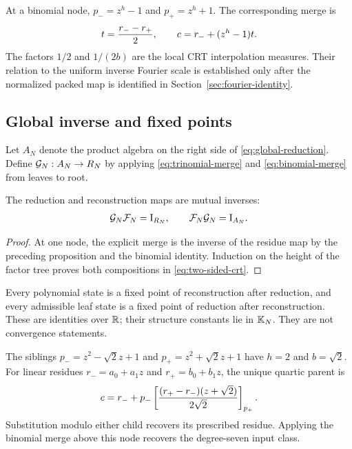 At a binomial node, $p_-=z^h-1$ and $p_+=z^h+1$.  The corresponding merge is
\begin{equation}
 t={r_--r_+\over2},
 \qquad c=r_-+(z^h-1)t.
 \label{eq:binomial-merge}
\end{equation}
The factors $1/2$ and $1/(2b)$ are the local CRT interpolation measures.  Their
relation to the uniform inverse Fourier scale is established only after the
normalized packed map is identified in Section~\ref{sec:fourier-identity}.

\subsection{Global inverse and fixed points}

Let $A_N$ denote the product algebra on the right side of
\eqref{eq:global-reduction}.  Define $\mathcal{G}_N:A_N\to R_N$ by applying
\eqref{eq:trinomial-merge} and \eqref{eq:binomial-merge} from leaves to root.

\begin{theorem}
The reduction and reconstruction maps are mutual inverses:
\begin{equation}
 \mathcal{G}_N\mathcal{F}_N=\mathrm{I}_{R_N},
 \qquad
 \mathcal{F}_N\mathcal{G}_N=\mathrm{I}_{A_N}.
 \label{eq:two-sided-crt}
\end{equation}
\end{theorem}
\begin{proof}
At one node, the explicit merge is the inverse of the residue map by the
preceding proposition and the binomial identity.  Induction on the height of
the factor tree proves both compositions in \eqref{eq:two-sided-crt}.
\end{proof}

\begin{corollary}
Every polynomial state is a fixed point of reconstruction after reduction, and
every admissible leaf state is a fixed point of reduction after reconstruction.
These are identities over $\mathbb{R}$; their structure constants lie in $\mathbb{K}_N$.
They are not convergence statements.
\end{corollary}

\begin{example}[A symbolic $N=8$ merge]
The siblings $p_-=z^2-\sqrt2z+1$ and
$p_+=z^2+\sqrt2z+1$ have $h=2$ and $b=\sqrt2$.  For linear residues
$r_-=a_0+a_1z$ and $r_+=b_0+b_1z$, the unique quartic parent is
\begin{equation}
 c=r_-+p_-\left[
 {(r_+-r_-)(z+\sqrt2)\over2\sqrt2}
 \right]_{p_+}.
 \label{eq:n8-symbolic-merge}
\end{equation}
Substitution modulo either child recovers its prescribed residue.  Applying the
binomial merge above this node recovers the degree-seven input class.
\end{example}
